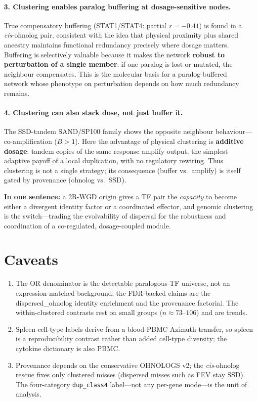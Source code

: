 \documentclass[11pt]{article}
\newcommand{\dcfour}{\texttt{dup\_class4}}
\newcommand{\dispoh}{\textcolor{ohnolog}{dispersed\_ohnolog}}
\begin{document}
\paragraph{3. Clustering enables paralog buffering at dosage-sensitive nodes.}
True compensatory buffering (STAT1/STAT4: partial $r=-0.41$) is found in a \emph{cis}-ohnolog
pair, consistent with the idea that physical proximity plus shared ancestry maintains
functional redundancy precisely where dosage matters. Buffering is selectively valuable
because it makes the network \textbf{robust to perturbation of a single member}: if one
paralog is lost or mutated, the neighbour compensates. This is the molecular basis for a
paralog-buffered network whose phenotype on perturbation depends on how much redundancy
remains.

\paragraph{4. Clustering can also stack dose, not just buffer it.}
The SSD-tandem SAND/SP100 family shows the opposite neighbour behaviour---co-amplification
($B>1$). Here the advantage of physical clustering is \textbf{additive dosage}: tandem
copies of the same response amplify output, the simplest adaptive payoff of a local
duplication, with no regulatory rewiring. Thus clustering is not a single strategy; its
consequence (buffer vs.\ amplify) is itself gated by provenance (ohnolog vs.\ SSD).

\medskip\noindent
\textbf{In one sentence:} a 2R-WGD origin gives a TF pair the \emph{capacity} to become
either a divergent identity factor or a coordinated effector, and genomic clustering is the
switch---trading the evolvability of dispersal for the robustness and coordination of a
co-regulated, dosage-coupled module.

\section{Caveats}
\begin{enumerate}[leftmargin=1.6em,itemsep=1pt]
\item The OR denominator is the detectable paralogous-TF universe, not an
expression-matched background; the FDR-backed claims are the \dispoh{} identity
enrichment and the provenance factorial. The within-clustered contrasts rest on small
groups ($n\approx73$--$106$) and are trends.
\item Spleen cell-type labels derive from a blood-PBMC Azimuth transfer, so spleen is a
reproducibility contrast rather than added cell-type diversity; the cytokine dictionary is
also PBMC.
\item Provenance depends on the conservative OHNOLOGS v2; the \emph{cis}-ohnolog rescue
fixes only clustered misses (dispersed misses such as FEV stay SSD). The four-category
\dcfour{} label---not any per-gene mode---is the unit of analysis.
\end{enumerate}
\end{document}
